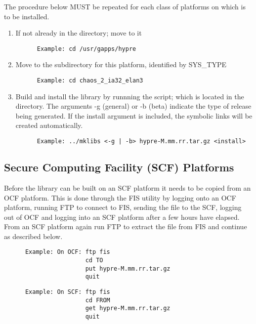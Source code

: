 The procedure below MUST be repeated for each class of platforms on which \hypre{} is 
to be installed. 

\begin{enumerate}
\item If not already in the  directory; move to it
\begin{verbatim}
      Example: cd /usr/gapps/hypre
\end{verbatim}
\item Move to the subdirectory for this platform, identified by SYS\_TYPE
\begin{verbatim}
      Example: cd chaos_2_ia32_elan3
\end{verbatim}
\item Build and install the library by runnning the  script; which is
         located in the  directory.
      The arguments -g (general) or -b (beta) indicate the type of release being 
          generated.  If the install argument is included, the symbolic links will 
          be created automatically.
\begin{verbatim}
      Example: ../mklibs <-g | -b> hypre-M.mm.rr.tar.gz <install>
\end{verbatim}
\end{enumerate}

\subsection{Secure Computing Facility (SCF) Platforms}
\label{Secure Computing Facility (SCF) Platforms}

Before the \hypre{} library can be built on an SCF platform it needs to be 
copied from an OCF platform.  This is done through the FIS utility by logging
onto an OCF platform, running FTP to connect to FIS, sending the file to the SCF, 
logging out of OCF and logging into an SCF platform after a few hours have elapsed.
From an SCF platform again run FTP to extract the file from FIS and continue as
described below.
\begin{verbatim}
      Example: On OCF: ftp fis
                       cd TO
                       put hypre-M.mm.rr.tar.gz
                       quit
\end{verbatim}

\begin{verbatim}
      Example: On SCF: ftp fis
                       cd FROM
                       get hypre-M.mm.rr.tar.gz
                       quit
\end{verbatim}

